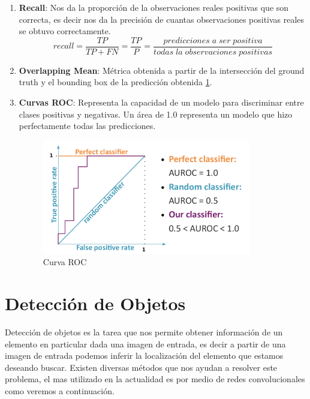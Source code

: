 \begin{enumerate}
\item \textbf{Recall}: Nos da la proporción de la observaciones reales positivas que son correcta, es decir nos da la precisión de cuantas observaciones positivas reales se obtuvo correctamente.
\begin{equation}
recall = \frac{TP}{TP+FN} = \frac{TP}{P} = \frac{predicciones\;a\;ser\;positiva}{todas\;la\;observaciones\;positivas} 
\end{equation}

\item \textbf{Overlapping Mean}: Métrica obtenida a partir de la intersección del ground truth y el bounding box de la predicción obtenida \ref{Fig: roc}.

\item \textbf{Curvas ROC}: Representa la capacidad de un modelo para discriminar entre clases positivas y negativas. Un área de 1.0 representa un modelo que hizo perfectamente todas las predicciones.
\begin{figure}[H]
 \centering
  \includegraphics[height=5cm,keepaspectratio=true,clip=true]{imagenes/MarcoTeorico/curvas-roc.png}
  \caption{Curva ROC}
	\label{Fig: roc}
\end{figure}


\end{enumerate}


\section{Detección de Objetos}\label{sec:compueter-vision}

Detección de objetos es la tarea que nos permite obtener información de un elemento en particular dada una imagen de entrada, es decir a partir de una imagen de entrada podemos inferir la localización del elemento que estamos deseando buscar. Existen diversas métodos que nos ayudan a resolver este problema, el mas utilizado en la actualidad es por medio de redes convolucionales como veremos a continuación.

